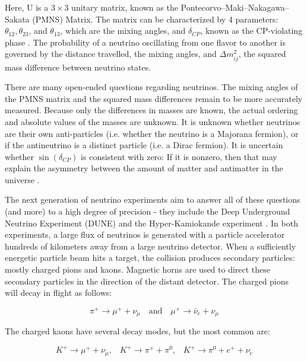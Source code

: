 Here, U is a $3 \times 3$ unitary matrix, known as the Pontecorvo–Maki–Nakagawa–Sakata (PMNS) Matrix. The matrix can be characterized by 4 parameters: $\theta_{12}, \theta_{23}$, and $\theta_{13}$, which are the mixing angles, and $\delta_{CP}$, known as the CP-violating phase \cite{pdg2018}. The probability of a neutrino oscillating from one flavor to another is governed by the distance travelled, the mixing angles, and $\Delta m_{ij}^2$, the squared mass difference between neutrino states. 


There are many open-ended questions regarding neutrinos.
The mixing angles of the PMNS matrix and the squared mass differences remain to be more accurately measured.
Because only the differences in masses are known, the actual ordering and absolute values of the masses are unknown.
It is unknown whether neutrinos are their own anti-particles (i.e. whether the neutrino is a Majorana fermion), or if the antineutrino is a distinct particle (i.e. a Dirac fermion).
It is uncertain whether $\sin(\delta_{CP})$ is consistent with zero: If it is nonzero, then that may explain the asymmetry between the amount of matter and antimatter in the universe \cite{neutrinoCP}.

The next generation of neutrino experiments aim to answer all of these questions (and more) to a high degree of precision - they include the Deep Underground Neutrino Experiment (DUNE) \cite{duneDesign} and the Hyper-Kamiokande experiment \cite{hyperKDesign}.
In both experiments, a large flux of neutrinos is generated with a particle accelerator hundreds of kilometers away from a large neutrino detector.
When a sufficiently energetic particle beam hits a target, the collision produces secondary particles: mostly charged pions and kaons.
Magnetic horns are used to direct these secondary particles in the direction of the distant detector.  
The charged pions will decay in flight as follows:

\begin{equation}
\pi^+ \rightarrow \mu^+ + \nu_\mu \quad   \text{and} \quad \mu^+ \rightarrow \bar{\nu}_e + \nu_\mu
\end{equation}

The charged kaons have several decay modes, but the most common are:

\begin{equation}
K^+ \rightarrow \mu^+ + \nu_\mu \text{,} \quad  K^+ \rightarrow \pi^+ + \pi^0  \text{,}\quad K^+ \rightarrow \pi^0 + e^+ + \nu_e
\end{equation}

